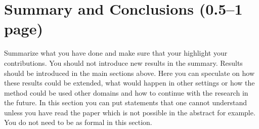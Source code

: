 \documentclass[a4paper,12pt]{article}
\begin{document}
\section{Summary and Conclusions (0.5--1 page)}
\label{sec:summary}

Summarize what you have done and make sure that your highlight your
contributions. 
You should not introduce new results in the summary.
 Results should be introduced in the main sections above.
Here you can speculate on how these results could be extended, what would
happen in other settings or how the method could be used other domains
and how to continue with the research in the future.
In this section you can put statements that one cannot understand unless you have read
the paper which is not possible in the abstract for example. You do
not need to be as formal in this section.





\end{document}
